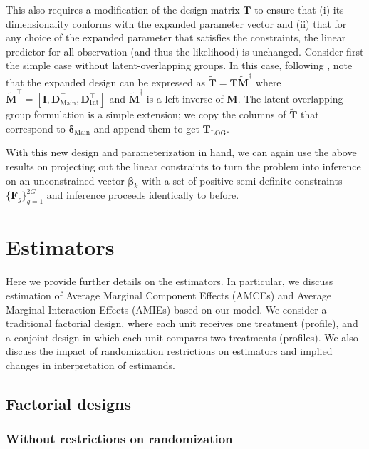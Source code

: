 This also requires a modification of the design matrix $\bm{T}$ to ensure that (i) its dimensionality conforms with the expanded parameter vector and (ii) that for any choice of the expanded parameter that satisfies the constraints, the linear predictor for all observation (and thus the likelihood) is unchanged. Consider first the simple case without latent-overlapping groups. In this case, following \cite{bondell2009anova}, note that the expanded design can be expressed as $\tilde{\bm{T}} = \bm{T}\tilde{\bm{M}}^\dagger$ where $\tilde{\bm{M}}^\top = [ \bm{I}, \bm{D}_{\mathrm{Main}}^\top, \bm{D}_{\mathrm{Int}}^\top]$ and $\tilde{\bm{M}}^\dagger$ is a left-inverse of $\tilde{\bm{M}}$. The latent-overlapping group formulation is a simple extension; we copy the columns of $\tilde{\bm{T}}$ that correspond to $\bm{\delta}_{\mathrm{Main}}$ and append them to get $\bm{T}_{\mathrm{LOG}}$.

With this new design and parameterization in hand, we can again use the above results on projecting out the linear constraints to turn the problem into inference on an unconstrained vector $\bm{\beta}_k$ with a set of positive semi-definite constraints $\{\bm{F}_g\}_{g=1}^{2G}$ and inference proceeds identically to before.


\section{Estimators}\label{append:amce_acie_der}

Here we provide further details on the estimators.  In particular, we
discuss estimation of Average Marginal Component Effects (AMCEs) and
Average Marginal Interaction Effects (AMIEs) based on our model.  We
consider a traditional factorial design, where each unit receives one
treatment (profile), and a conjoint design in which each unit compares
two treatments (profiles).  We also discuss the impact of
randomization restrictions on estimators and implied changes in
interpretation of estimands.

\subsection{Factorial designs}\label{append:amce_fac}

\subsubsection{Without restrictions on randomization}\label{append:fac_unrest_rand}

